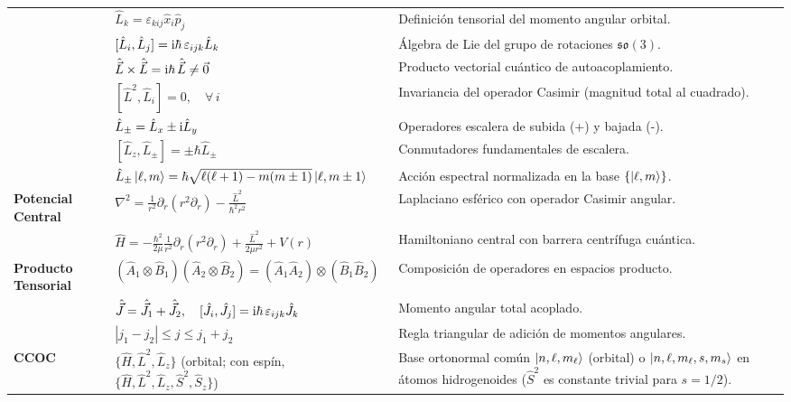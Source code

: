 \begin{appendices}
\begin{table}[H]
{\begin{tabular}{@{}llp{8.5cm}@{}}
        \addlinespace[2pt]
        & $\hat{L}_k = \varepsilon_{kij}\hat{x}_i\hat{p}_j$ & Definición tensorial del momento angular orbital. \\
        \addlinespace[2pt]
        & $[\hat{L}_i, \hat{L}_j] = \mathrm{i}\hbar\,\varepsilon_{ijk}\hat{L}_k$ & Álgebra de Lie del grupo de rotaciones $\mathfrak{so}(3)$. \\
        \addlinespace[2pt]
        & $\hat{\vec{L}} \times \hat{\vec{L}} = \mathrm{i}\hbar\,\hat{\vec{L}} \neq \vec{0}$ & Producto vectorial cuántico de autoacoplamiento. \\
        \addlinespace[2pt]
        & $[\hat{L}^2, \hat{L}_i] = 0, \quad \forall\,i$ & Invariancia del operador Casimir (magnitud total al cuadrado). \\
        \addlinespace[2pt]
        & $\hat{L}_\pm = \hat{L}_x \pm \mathrm{i}\hat{L}_y$ & Operadores escalera de subida (+) y bajada (-). \\
        \addlinespace[2pt]
        & $[\hat{L}_z, \hat{L}_\pm] = \pm\hbar\hat{L}_\pm$ & Conmutadores fundamentales de escalera. \\
        \addlinespace[2pt]
        & $\hat{L}_\pm\left| \ell, m \right\rangle = \hbar\sqrt{\ell(\ell+1)-m(m\pm 1)}\left| \ell, m\pm 1 \right\rangle$ & Acción espectral normalizada en la base $\{\left| \ell, m \right\rangle\}$. \\
        \midrule
        \textbf{Potencial Central} & $\nabla^2 = \frac{1}{r^2}\partial_r(r^2\partial_r) - \frac{\hat{L}^2}{\hbar^2 r^2}$ & Laplaciano esférico con operador Casimir angular. \\
        \addlinespace[2pt]
        & $\hat{H} = -\frac{\hbar^2}{2\mu}\frac{1}{r^2}\partial_r(r^2\partial_r) + \frac{\hat{L}^2}{2\mu r^2} + V(r)$ & Hamiltoniano central con barrera centrífuga cuántica. \\
        \midrule
        \textbf{Producto Tensorial} & $(\hat{A}_1 \otimes \hat{B}_1)(\hat{A}_2 \otimes \hat{B}_2) = (\hat{A}_1\hat{A}_2)\otimes(\hat{B}_1\hat{B}_2)$ & Composición de operadores en espacios producto. \\
        \addlinespace[2pt]
        & $\hat{\vec{J}} = \hat{\vec{J}}_1 + \hat{\vec{J}}_2, \quad [\hat{J}_i, \hat{J}_j] = \mathrm{i}\hbar\,\varepsilon_{ijk}\hat{J}_k$ & Momento angular total acoplado. \\
        \addlinespace[2pt]
        & $|j_1 - j_2| \le j \le j_1 + j_2$ & Regla triangular de adición de momentos angulares. \\
        \midrule
        \textbf{CCOC} & $\{\hat{H}, \hat{L}^2, \hat{L}_z\}$ (orbital; con espín, $\{\hat{H}, \hat{L}^2, \hat{L}_z, \hat{S}^2, \hat{S}_z\}$) & Base ortonormal común $\left| n, \ell, m_\ell \right\rangle$ (orbital) o $\left| n, \ell, m_\ell, s, m_s \right\rangle$ en átomos hidrogenoides ($\hat{S}^2$ es constante trivial para $s=1/2$). \\
        \bottomrule
    \end{tabular}%
    }
\end{table}


\end{appendices}
